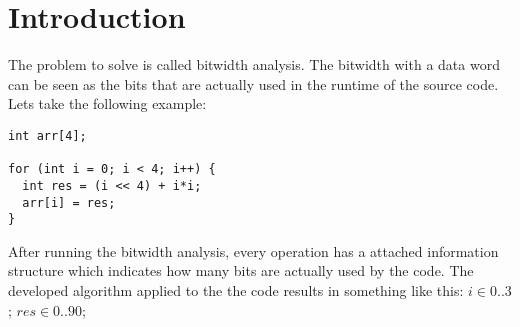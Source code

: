 \chapter{Introduction}\label{sec:intro}

The problem to solve is called bitwidth analysis.
The bitwidth with a data word can be seen as the bits that are actually used in the runtime of the source code. Lets take the following example:
\begin{lstlisting}[frame=single]
int arr[4];

for (int i = 0; i < 4; i++) {
  int res = (i << 4) + i*i; 
  arr[i] = res;
}
\end{lstlisting}

After running the bitwidth analysis, every operation has a attached information structure which indicates how many bits are actually used by the code. The developed algorithm applied to the the code results in something like this:
\linebreak
$ i \in {0..3}$;
$ res \in {0..90}$; 
